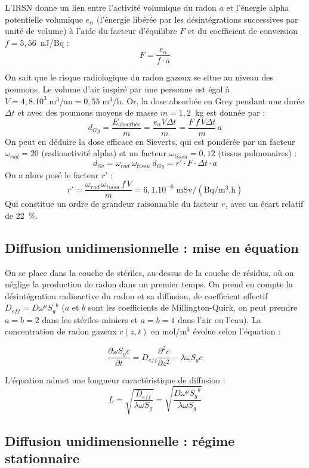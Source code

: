 \documentclass{article}
\begin{document}
L’IRSN donne un lien \cite{irsn_ineris_radon_nodate} entre l’activité volumique du radon $a$ et l’énergie alpha potentielle volumique $e_{\alpha}$ (l’énergie libérée par les désintégrations successives par unité de volume) à l’aide du facteur d’équilibre $F$ et du coefficient de conversion $f=5,56$~nJ/Bq :
$$
F=\frac{e_{\alpha}}{f\cdot a}
$$

On sait que le risque radiologique du radon gazeux se situe au niveau des poumons. Le volume d’air inspiré par une personne est égal à $V=4,8.10^3 \;  \text{m}^3/\text{an}=0,55 \; \text{m}^3/\text{h}$. Or, la dose absorbée en Grey pendant une durée $\Delta t$ et avec des poumons moyens de masse $m=1,2$~kg est donnée par : 
$$
d_{Gy}=\frac{E_{\text{absorbée}}}{m}=\frac{e_{\alpha} V \Delta t}{m}=\frac{F\,f\,V\Delta t}{m}\,a
$$
On peut en déduire la dose efficace en Sieverts, qui est pondérée par un facteur $\omega_{rad}=20$ (radioactivité alpha) et un facteur $\omega_{tissu}=0,12$ (tissus pulmonaires) :
$$
d_{Sv}=\omega_{rad}\: \omega_{tissu} \: d_{Gy} = r'\cdot F\cdot\Delta t\cdot a
$$
On a alors posé le facteur $r'$ :
$$
r'= \frac{\omega_{rad}\, \omega_{tissu}\,  f\,V}{m}=6,1.10^{-6} \; \text{m}\text{Sv}/(\text{Bq}/\text{m}^3.\text{h})
$$
Qui constitue un ordre de grandeur raisonnable du facteur $r$, avec un écart relatif de 22~\%.

\subsection{Diffusion unidimensionnelle : mise en équation}
\label{annexe:equation}

On se place dans la couche de stériles, au-dessus de la couche de résidus, où on néglige la production de radon dans un premier temps. On prend en compte la désintégration radioactive du radon et sa diffusion, de coefficient effectif $D_{eff}=D \omega^a {S_g}^b$ ($a$ et $b$ sont les coefficients de Millington-Quirk, on peut prendre $a=b=2$ dans les stériles miniers et $a=b=1$ dans l’air ou l’eau). La concentration de radon gazeux $c(z,t)$ en mol/m$^3$ évolue selon l’équation \cite{ferry_migration_2000} :

$$
\frac{\partial \omega S_g c}{\partial t} = D_{eff}  \frac{\partial^2 c}{\partial z^2}-\lambda \omega S_g c
$$

L’équation admet une longueur caractéristique de diffusion :
$$
L=\sqrt{\frac{D_{eff}}{\lambda \omega S_g }}=\sqrt{\frac{D \omega^a {S_g}^b}{\lambda \omega S_g }}
$$

\subsection{Diffusion unidimensionnelle : régime stationnaire}
\label{annexe:reg_stat}
\end{document}
